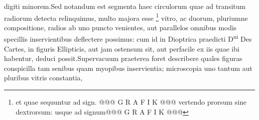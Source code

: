                      digiti minorem.\pend \pstart  Sed notandum est segmenta haec circulorum quae ad transitum radiorum detecta relinquimus, multo majora esse \footnote{ et  quae sequuntur ad sign. @@@ G R A F I K @@@ vertendo prorsum sine dextrorsum: usque ad signum@@@ G R A F I K @@@} vitro, ac duorum, pluriumne compositione, radios ab uno  puncto venientes, aut parallelos omnibus modis specillis\protect{}  inservientibus deflectere possimus: cum id in Dioptrica  praedicti D\textsuperscript{ni} Des Cartes\protect{}, in figuris Ellipticis, aut jam  ostensum sit, aut perfacile ex iis quae ibi habentur,  deduci possit.\pend \pstart  Supervacuum praeterea foret describere quales figuras  conspicilla tam senibus quam myopibus\protect{} inservientia; microscopia\protect{} uno tantum aut pluribus vitris constantia,